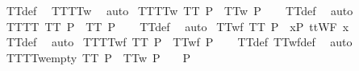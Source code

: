 \isatagproof
{}\isamarkupfalse%
\ TT{\isacharunderscore}def\ \isamarkupfalse%
\ TT{}{\isacharunderscore}TT{}w\ \isamarkupfalse%
\ auto%
\endisatagproof
{\isafoldproof}%
%
\isadelimproof
\isanewline
%
\endisadelimproof
\isanewline
{}\isamarkupfalse%
\ TT{\isacharunderscore}TT{}w{\isacharcolon}\ {\isachardoublequoteopen}TT\ P\ {\isasymLongrightarrow}\ TT{}w\ P{\isachardoublequoteclose}\isanewline
%
\isadelimproof
\ \ %
\endisadelimproof
%
\isatagproof
{}\isamarkupfalse%
\ TT{\isacharunderscore}def\ \isamarkupfalse%
\ auto%
\endisatagproof
{\isafoldproof}%
%
\isadelimproof
\isanewline
%
\endisadelimproof
\isanewline
{}\isamarkupfalse%
\ TT{\isacharunderscore}TT{}{\isacharcolon}\ {\isachardoublequoteopen}TT\ P\ {\isasymLongrightarrow}\ TT{}\ P{\isachardoublequoteclose}\isanewline
%
\isadelimproof
\ \ %
\endisadelimproof
%
\isatagproof
{}\isamarkupfalse%
\ TT{\isacharunderscore}def\ \isamarkupfalse%
\ auto%
\endisatagproof
{\isafoldproof}%
%
\isadelimproof
\isanewline
%
\endisadelimproof
\isanewline
{}\isamarkupfalse%
\ TT{\isacharunderscore}wf{\isacharcolon}\ {\isachardoublequoteopen}TT\ P\ {\isasymLongrightarrow}\ {\isasymforall}x{\isasymin}P{\isachardot}\ ttWF\ x{\isachardoublequoteclose}\isanewline
%
\isadelimproof
\ \ %
\endisadelimproof
%
\isatagproof
{}\isamarkupfalse%
\ TT{\isacharunderscore}def\ \isamarkupfalse%
\ auto%
\endisatagproof
{\isafoldproof}%
%
\isadelimproof
\isanewline
%
\endisadelimproof
\isanewline
{}\isamarkupfalse%
\ TT{\isacharunderscore}TTwf{\isacharcolon}\ {\isachardoublequoteopen}TT\ P\ {\isasymLongrightarrow}\ TTwf\ P{\isachardoublequoteclose}\isanewline
%
\isadelimproof
\ \ %
\endisadelimproof
%
\isatagproof
{}\isamarkupfalse%
\ TT{\isacharunderscore}def\ TTwf{\isacharunderscore}def\ \isamarkupfalse%
\ auto%
\endisatagproof
{\isafoldproof}%
%
\isadelimproof
\isanewline
%
\endisadelimproof
\isanewline
{}\isamarkupfalse%
\ TT{}{\isacharunderscore}TT{}w{\isacharunderscore}empty{\isacharcolon}\ {\isachardoublequoteopen}TT{}\ P\ {\isasymLongrightarrow}\ TT{}w\ P\ {\isasymLongrightarrow}\ {\isacharbrackleft}{\isacharbrackright}\ {\isasymin}\ P{\isachardoublequoteclose}\isanewline
%
\isadelimproof
\ \ %
\endisadelimproof
%
\isatagproof
{}\isamarkupfalse%
